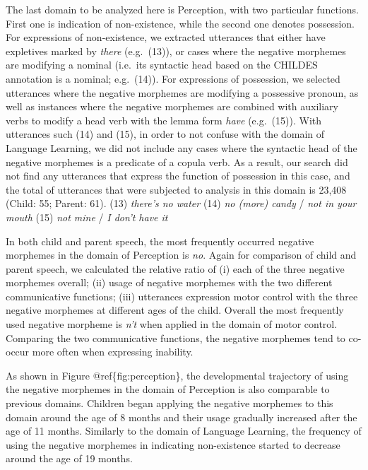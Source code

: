 \documentclass[10pt, letterpaper]{article}
\begin{document}
The last domain to be analyzed here is Perception, with two particular
functions. First one is indication of non-existence, while the second
one denotes possession. For expressions of non-existence, we extracted
utterances that either have expletives marked by \emph{there}
(e.g.~(13)), or cases where the negative morphemes are modifying a
nominal (i.e.~its syntactic head based on the CHILDES annotation is a
nominal; e.g.~(14)). For expressions of possession, we selected
utterances where the negative morphemes are modifying a possessive
pronoun, as well as instances where the negative morphemes are combined
with auxiliary verbs to modify a head verb with the lemma form
\emph{have} (e.g.~(15)). With utterances such (14) and (15), in order to
not confuse with the domain of Language Learning, we did not include any
cases where the syntactic head of the negative morphemes is a predicate
of a copula verb. As a result, our search did not find any utterances
that express the function of possession in this case, and the total of
utterances that were subjected to analysis in this domain is 23,408
(Child: 55; Parent: 61). (13) \emph{there's no water} (14) \emph{no
(more) candy} / \emph{not in your mouth} (15) \emph{not mine} / \emph{I
don't have it}

In both child and parent speech, the most frequently occurred negative
morphemes in the domain of Perception is \emph{no}. Again for comparison
of child and parent speech, we calculated the relative ratio of (i) each
of the three negative morphemes overall; (ii) usage of negative
morphemes with the two different communicative functions; (iii)
utterances expression motor control with the three negative morphemes at
different ages of the child. Overall the most frequently used negative
morpheme is \emph{n't} when applied in the domain of motor control.
Comparing the two communicative functions, the negative morphemes tend
to co-occur more often when expressing inability.

As shown in Figure @ref\{fig:perception\}, the developmental trajectory
of using the negative morphemes in the domain of Perception is also
comparable to previous domains. Children began applying the negative
morphemes to this domain around the age of 8 months and their usage
gradually increased after the age of 11 months. Similarly to the domain
of Language Learning, the frequency of using the negative morphemes in
indicating non-existence started to decrease around the age of 19
months.
\end{document}
